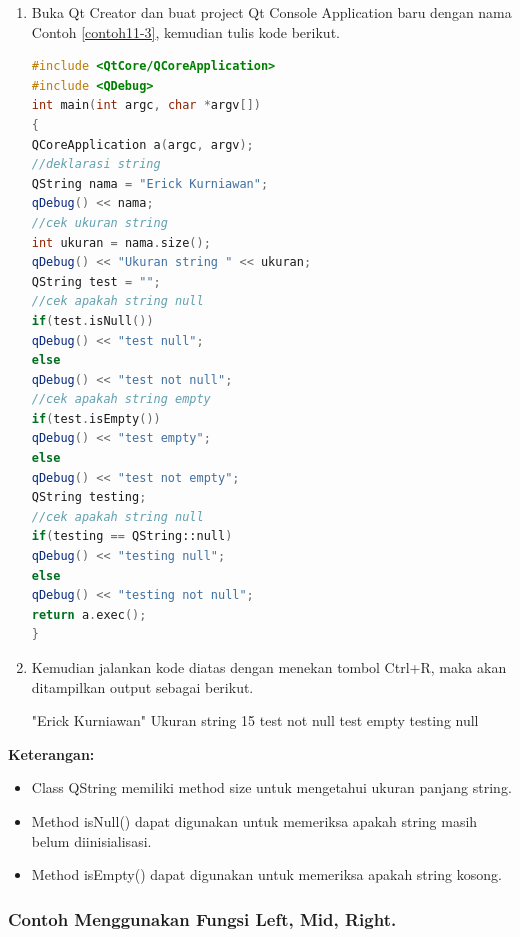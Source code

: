 \begin{enumerate}

\item
  Buka Qt Creator dan buat project Qt Console Application baru dengan
  nama Contoh \ref{contoh11-3}, kemudian tulis kode berikut.

\begin{lstlisting}[language=c++, caption= Cek apakah nilai QString Null atau Empty, label=contoh11-3]
#include <QtCore/QCoreApplication>
#include <QDebug>
int main(int argc, char *argv[])
{
QCoreApplication a(argc, argv);
//deklarasi string
QString nama = "Erick Kurniawan";
qDebug() << nama;
//cek ukuran string
int ukuran = nama.size();
qDebug() << "Ukuran string " << ukuran;
QString test = "";
//cek apakah string null
if(test.isNull())
qDebug() << "test null";
else
qDebug() << "test not null";
//cek apakah string empty
if(test.isEmpty())
qDebug() << "test empty";
else
qDebug() << "test not empty";
QString testing;
//cek apakah string null
if(testing == QString::null)
qDebug() << "testing null";
else
qDebug() << "testing not null";
return a.exec();
}
\end{lstlisting}
\item
  Kemudian jalankan kode diatas dengan menekan tombol Ctrl+R, maka akan
  ditampilkan output sebagai berikut.

  \begin{lcverbatim}
"Erick Kurniawan"
Ukuran string  15
test not null
test empty
testing null
  \end{lcverbatim}
\end{enumerate}

\textbf{Keterangan:}

\begin{itemize}

\item
  Class QString memiliki method size untuk mengetahui ukuran panjang
  string.
\item
  Method isNull() dapat digunakan untuk memeriksa apakah string masih
  belum diinisialisasi.
\item
  Method isEmpty() dapat digunakan untuk memeriksa apakah string kosong.
\end{itemize}

\subsubsection*{Contoh  Menggunakan Fungsi Left, Mid, Right.}

